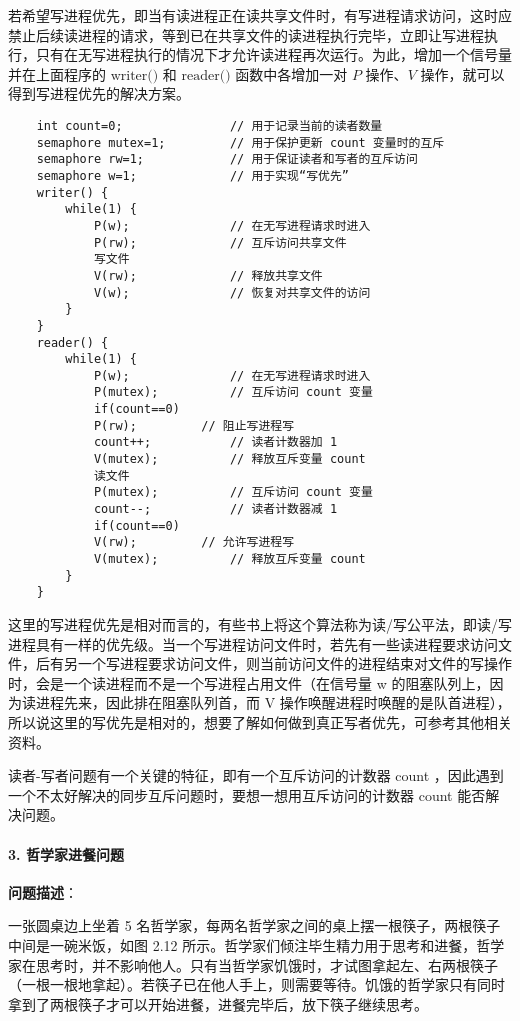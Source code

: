 \documentclass{ctexbook}
\begin{document}
若希望写进程优先，即当有读进程正在读共享文件时，有写进程请求访问，这时应禁止后续读进程的请求，等到已在共享文件的读进程执行完毕，立即让写进程执行，只有在无写进程执行的情况下才允许读进程再次运行。为此，增加一个信号量并在上面程序的 $\text{writer()}$ 和 $\text{reader()}$ 函数中各增加一对 $P$ 操作、$V$ 操作，就可以得到写进程优先的解决方案。
\begin{lstlisting}
	int count=0;               // 用于记录当前的读者数量
	semaphore mutex=1;         // 用于保护更新 count 变量时的互斥
	semaphore rw=1;            // 用于保证读者和写者的互斥访问
	semaphore w=1;             // 用于实现“写优先”
	writer() {
		while(1) {
			P(w);              // 在无写进程请求时进入
			P(rw);             // 互斥访问共享文件
			写文件
			V(rw);             // 释放共享文件
			V(w);              // 恢复对共享文件的访问
		}
	}
	reader() {
		while(1) {
			P(w);              // 在无写进程请求时进入
			P(mutex);          // 互斥访问 count 变量
			if(count==0)
			P(rw);         // 阻止写进程写
			count++;           // 读者计数器加 1
			V(mutex);          // 释放互斥变量 count
			读文件
			P(mutex);          // 互斥访问 count 变量
			count--;           // 读者计数器减 1
			if(count==0)
			V(rw);         // 允许写进程写
			V(mutex);          // 释放互斥变量 count
		}
	}
\end{lstlisting}
这里的写进程优先是相对而言的，有些书上将这个算法称为读/写公平法，即读/写进程具有一样的优先级。当一个写进程访问文件时，若先有一些读进程要求访问文件，后有另一个写进程要求访问文件，则当前访问文件的进程结束对文件的写操作时，会是一个读进程而不是一个写进程占用文件（在信号量 w 的阻塞队列上，因为读进程先来，因此排在阻塞队列首，而 V 操作唤醒进程时唤醒的是队首进程），所以说这里的写优先是相对的，想要了解如何做到真正写者优先，可参考其他相关资料。

读者-写者问题有一个关键的特征，即有一个互斥访问的计数器 count ，因此遇到一个不太好解决的同步互斥问题时，要想一想用互斥访问的计数器 count 能否解决问题。

\paragraph{3. 哲学家进餐问题}

\textbf{问题描述}：

一张圆桌边上坐着 5 名哲学家，每两名哲学家之间的桌上摆一根筷子，两根筷子中间是一碗米饭，如图 2.12 所示。哲学家们倾注毕生精力用于思考和进餐，哲学家在思考时，并不影响他人。只有当哲学家饥饿时，才试图拿起左、右两根筷子（一根一根地拿起）。若筷子已在他人手上，则需要等待。饥饿的哲学家只有同时拿到了两根筷子才可以开始进餐，进餐完毕后，放下筷子继续思考。
\end{document}
